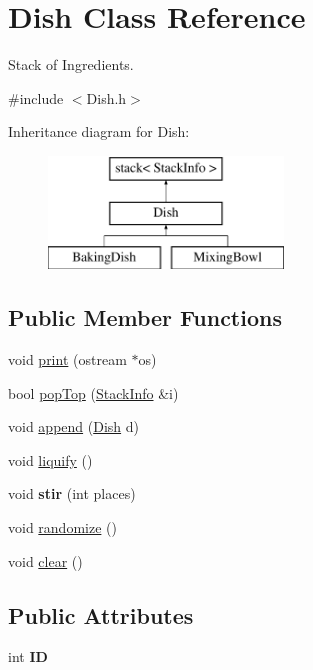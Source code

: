 \hypertarget{classDish}{\section{Dish Class Reference}
\label{classDish}
}


Stack of Ingredients.  




{\ttfamily \#include $<$Dish.\-h$>$}

Inheritance diagram for Dish\-:\begin{figure}[H]
\begin{center}
\leavevmode
\includegraphics[height=3.000000cm]{classDish}
\end{center}
\end{figure}
\subsection*{Public Member Functions}
\begin{DoxyCompactItemize}
\item 
void \hyperlink{classDish_a1af363ad3f1c4df4971f82051763df20}{print} (ostream $\ast$os)
\item 
bool \hyperlink{classDish_a437c63798f934fdc3c80037d77a0d51e}{pop\-Top} (\hyperlink{structStackInfo}{Stack\-Info} \&i)
\item 
void \hyperlink{classDish_a2454c3444480c5a7c38181c3e6cf8cd8}{append} (\hyperlink{classDish}{Dish} d)
\item 
void \hyperlink{classDish_a41b6fc6a531325d36d4607546291386b}{liquify} ()
\item 
\hypertarget{classDish_a9a8e6f0fd75809de987cb0cd1c89daab}{void {\bfseries stir} (int places)}\label{classDish_a9a8e6f0fd75809de987cb0cd1c89daab}

\item 
void \hyperlink{classDish_a1c60aa114f084117df18578e58f0725d}{randomize} ()
\item 
void \hyperlink{classDish_ac2d02755a7c24232df45ca64dc519858}{clear} ()
\end{DoxyCompactItemize}
\subsection*{Public Attributes}
\begin{DoxyCompactItemize}
\item 
\hypertarget{classDish_a14264990a9a7bc34f61336eeb6dcfcbd}{int {\bfseries I\-D}}\label{classDish_a14264990a9a7bc34f61336eeb6dcfcbd}

\end{DoxyCompactItemize}
